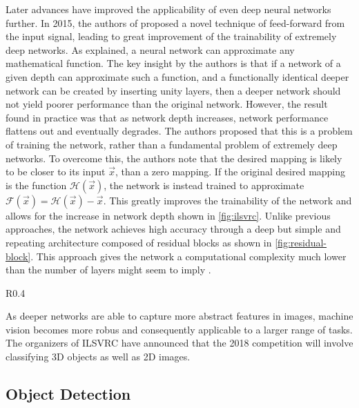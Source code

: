 \documentclass[\rootfolder/main.tex]{subfiles}
\begin{document}
Later advances have improved the applicability of even deep neural networks further.
In 2015, the authors of \cite{He2016} proposed a novel technique of feed-forward from the input signal, leading to great improvement of the trainability of extremely deep networks.
As explained, a neural network can approximate any mathematical function.
The key insight by the authors is that if a network of a given depth can approximate such a function, and a functionally identical deeper network can be created by inserting unity layers, then a deeper network should not yield poorer performance than the original network.
However, the result found in practice was that as network depth increases, network performance flattens out and eventually degrades.
The authors proposed that this is a problem of training the network, rather than a fundamental problem of extremely deep networks.
To overcome this, the authors note that the desired mapping is likely to be closer to its input $\vec{x}$, than a zero mapping.
If the original desired mapping is the function $\mathcal{H}(\vec{x})$, the network is instead trained to approximate $\mathcal{F}(\vec{x}) = \mathcal{H}(\vec{x}) - \vec{x}$.
This greatly improves the trainability of the network and allows for the increase in network depth shown in \cref{fig:ilsvrc}.
Unlike previous approaches, the network achieves high accuracy through a deep but simple and repeating architecture composed of residual blocks as shown in \cref{fig:residual-block}.
This approach gives the network a computational complexity much lower than the number of layers might seem to imply \cite{He2016}.

\begin{wrapfigure}{R}{0.4\columnwidth}
    \caption{Residual block \cite{He2016}.\label{fig:residual-block}}
\end{wrapfigure}

As deeper networks are able to capture more abstract features in images, machine vision becomes more robus and consequently applicable to a larger range of tasks.
The organizers of ILSVRC have announced that the 2018 competition will involve classifying 3D objects as well as 2D images.


\subsection{Object Detection}
\end{document}
